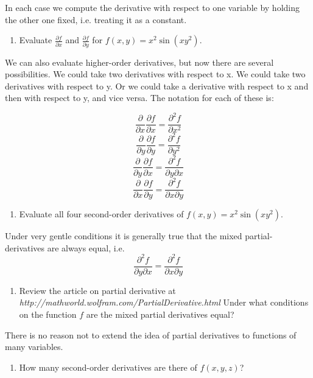 \documentclass{tufte-handout}
\begin{document}
In each case we compute the derivative with respect to one variable by holding the other one fixed, i.e. treating it as a constant.

\begin{enumerate}[resume]
\item Evaluate $\frac{\partial f}{\partial x}$ and $\frac{\partial f}{\partial y}$ for $f(x,y) = x^2 \sin(xy^2)$.
\end{enumerate}

We can also evaluate higher-order derivatives, but now there are several possibilities. We could take two derivatives with respect to x. We could take two derivatives with respect to y. Or we could take a derivative with respect to x and then with respect to y, and vice versa. The notation for each of these is:

\[\frac{\partial}{\partial x} \frac{\partial f}{\partial x} = \frac{\partial^2 f}{\partial x^2} \]
\[\frac{\partial}{\partial y} \frac{\partial f}{\partial y} = \frac{\partial^2 f}{\partial y^2} \]
\[\frac{\partial}{\partial y} \frac{\partial f}{\partial x} = \frac{\partial^2 f}{\partial y \partial x} \]
\[\frac{\partial}{\partial x} \frac{\partial f}{\partial y} = \frac{\partial^2 f}{\partial x \partial y} \]

\begin{enumerate}[resume]
\item Evaluate all four second-order derivatives of $f(x,y) = x^2 \sin(xy^2)$.
\end{enumerate}

Under very gentle conditions it is generally true that the mixed partial-derivatives are always equal, i.e. 
\[ \frac{\partial^2 f}{\partial y \partial x} = \frac{\partial^2 f}{\partial x \partial y} \]

\begin{enumerate}[resume]
\item Review the article on partial derivative at {\it http://mathworld.wolfram.com/PartialDerivative.html} Under what conditions on the function $f$ are the mixed partial derivatives equal?
\end{enumerate}

There is no reason not to extend the idea of partial derivatives to functions of many variables.

\begin{enumerate}[resume]
\item How many second-order derivatives are there of $f(x,y,z)$?
\end{enumerate}
\end{document}
